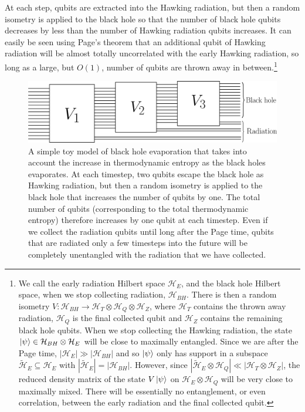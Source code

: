 \documentclass[12pt]{article}
\begin{document}
At each step, qubits are extracted into the Hawking radiation, but then a random isometry is applied to the black hole so that the number of black hole qubits decreases by less than the number of Hawking radiation qubits increases. It can easily be seen using Page's theorem \cite{page1993average} that an additional qubit of Hawking radiation will be almost totally uncorrelated with the early Hawking radiation, so long as a large, but $O(1)$, number of qubits are thrown away in between.\footnote{We call the early radiation Hilbert space $\mathcal{H}_E$, and the black hole Hilbert space, when we stop collecting radiation, $\mathcal{H}_{BH}$. There is then a random isometry $V: \mathcal{H}_{BH} \to \mathcal{H}_T \otimes \mathcal{H}_Q \otimes \mathcal{H}_Z$, where $\mathcal{H}_T$ contains the thrown away radiation, $\mathcal{H}_Q$ is the final collected qubit and $\mathcal{H}_Z$ contains the remaining black hole qubits.  When we stop collecting the Hawking radiation, the state $\ket{\psi} \in \mathcal{H}_{BH} \otimes \mathcal{H}_E$ will be close to maximally entangled. Since we are after the Page time, $|\mathcal{H}_E| \gg |\mathcal{H}_{BH}|$ and so $\ket{\psi}$ only has support in a subspace $\tilde{\mathcal{H}}_E \subseteq \mathcal{H}_E$ with $|\tilde{\mathcal{H}}_E| = |\mathcal{H}_{BH}|$.  However, since $|\tilde{\mathcal{H}}_E \otimes \mathcal{H}_Q| \ll |\mathcal{H}_T \otimes \mathcal{H}_Z |$, the reduced density matrix of the state $V \ket{\psi}$ on $\mathcal{H}_E \otimes \mathcal{H}_Q$ will be very close to maximally mixed. There will be essentially no entanglement, or even correlation, between the early radiation and the final collected qubit.}
\begin{figure}[t]
\includegraphics[width = 0.95\linewidth]{Irreversible.png}
\centering
\caption{A simple toy model of black hole evaporation that takes into account the increase in thermodynamic entropy as the black holes evaporates. At each timestep, two qubits escape the black hole as Hawking radiation, but then a random isometry is applied to the black hole that increases the number of qubits by one. The total number of qubits (corresponding to the total thermodynamic entropy) therefore increases by one qubit at each timestep. Even if we collect the radiation qubits until long after the Page time, qubits that are radiated only a few timesteps into the future will be completely unentangled with the radiation that we have collected.}
\label{fig:irreversible}
\end{figure}
\end{document}
